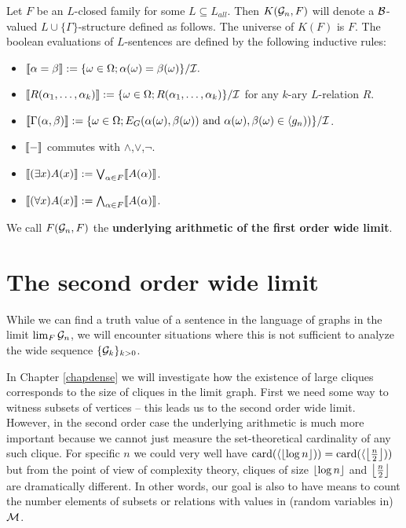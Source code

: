 \begin{defi}
Let $F$ be an $L$-closed family for some $L\subseteq L_{all}$. Then $K(\mathcal{G}_n,F)$ will denote a $\mathcal{B}$-valued $L\cup\{\Gamma\}$-structure defined as follows. The universe of $K(F)$ is $F$. The boolean evaluations of $L$-sentences are defined by the following inductive rules:

\begin{itemize}
\item $\llbracket \alpha=\beta \rrbracket := \{\omega\in\Omega; \alpha(\omega)=\beta(\omega)\}/\mathcal{I}.$
\item $\llbracket R(\alpha_1,\dots,\alpha_k) \rrbracket := \{\omega\in\Omega; R(\alpha_1,\dots,\alpha_k)\}/\mathcal{I}$ for any $k$-ary $L$-relation $R$.
\item $\llbracket \Gamma(\alpha,\beta) \rrbracket := \{\omega\in\Omega; E_G(\alpha(\omega),\beta(\omega))\text{ and }\alpha(\omega),\beta(\omega)\in\langle g_n))\}/\mathcal{I}$.
\item $\llbracket-\rrbracket$ commutes with $\land$,$\lor$,$\lnot$.
\item $\llbracket(\exists x)A(x)\rrbracket:=\bigvee_{\alpha\in F}\llbracket A(\alpha)\rrbracket$.
\item $\llbracket(\forall x)A(x)\rrbracket:=\bigwedge_{\alpha\in F}\llbracket A(\alpha)\rrbracket$.
\end{itemize}

We call $F(\mathcal{G}_n,F)$ the \textbf{underlying arithmetic of the first order wide limit}.
\end{defi}


\section{The second order wide limit}

While we can find a truth value of a sentence in the language of graphs in the limit $\lim_{F}\mathcal{G}_n$, we will encounter situations where this is not sufficient to analyze the wide sequence $\{\mathcal{G}_k\}_{k>0}$. 

In Chapter \ref{chapdense} we will investigate how the existence of large cliques corresponds to the size of cliques in the limit graph. First we need some way to witness subsets of vertices -- this leads us to the second order wide limit. However, in the second order case the underlying arithmetic is much more important because we cannot just measure the set-theoretical cardinality of any such clique. For specific $n$ we could very well have $\text{card}(\langle \left \lfloor {\log{n}} \right \rfloor))=\text{card}(\langle \left \lfloor {\frac{n}{2}} \right \rfloor))$ but from the point of view of complexity theory, cliques of size $\left \lfloor {\log n} \right \rfloor$ and $\left \lfloor {\frac{n}{2}} \right \rfloor$ are dramatically different. In other words, our goal is also to have means to count the number elements of subsets or relations with values in (random variables in) $\mathcal{M}$.


